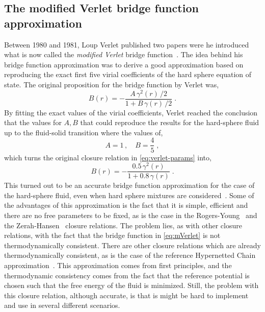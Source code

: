 \subsection{The modified Verlet bridge function approximation}
Between 1980 and 1981, Loup Verlet published two papers were he introduced what is now 
called the \emph{modified Verlet} bridge 
function~\cite{verletIntegralEquationsClassical1980,verletIntegralEquationsClassical1981}. 
The idea behind his bridge function approximation was to derive a good approximation based 
on reproducing the exact first five virial coefficients of the hard sphere equation of 
state. The original proposition for the bridge function by Verlet was,
\begin{equation}
    B(r) = - \frac{A \, \gamma^{2}(r) \, / 2}{1 + B \, \gamma(r) \, / 2}
    \; .
    \label{eq:verlet-params}
\end{equation}
By fitting the exact values of the virial coefficients, Verlet reached the conclusion that 
the values for \(A, B\) that could reproduce the results for the hard-sphere fluid up to 
the fluid-solid transition where the values of,
\begin{equation}
    A = 1 \, , \quad B = \frac{4}{5}
    \; ,
    \label{eq:ab-verlet}
\end{equation}
which turns the original closure relation in \autoref{eq:verlet-params} into,
\begin{equation}
    B(r) = - \frac{0.5 \, \gamma^{2}(r)}{1 + 0.8 \, \gamma(r)}
    \; .
    \label{eq:mVerlet}
\end{equation}
This turned out to be an accurate bridge function approximation for the case of the 
hard-sphere fluid, even when hard sphere mixtures are 
considered~\cite{lopez-sanchezDemixingTransitionStructure2013a}.
Some of the advantages of this approximation is the fact that it is simple, efficient and 
there are no free parameters to be fixed, as is the case in the 
Rogers-Young~\cite{rogersNewThermodynamicallyConsistent1984b} and the 
Zerah-Hansen~\cite{zerahSelfConsistentIntegral1986} closure relations. The problem lies, as 
with other closure relations, with the fact that the bridge function in 
\autoref{eq:mVerlet} is not thermodynamically consistent. There are other closure relations 
which are already thermodynamically consistent, as is the case of the reference Hypernetted 
Chain approximation~\cite{ladoSolutionsReferencehypernettedchainEquation1983}. This 
approximation comes from first principles, and the thermodynamic consistency comes from the 
fact that the reference potential is chosen such that the free energy of the fluid is 
minimized. Still, the problem with this closure relation, although accurate, is that is 
might be hard to implement and use in several different scenarios.

